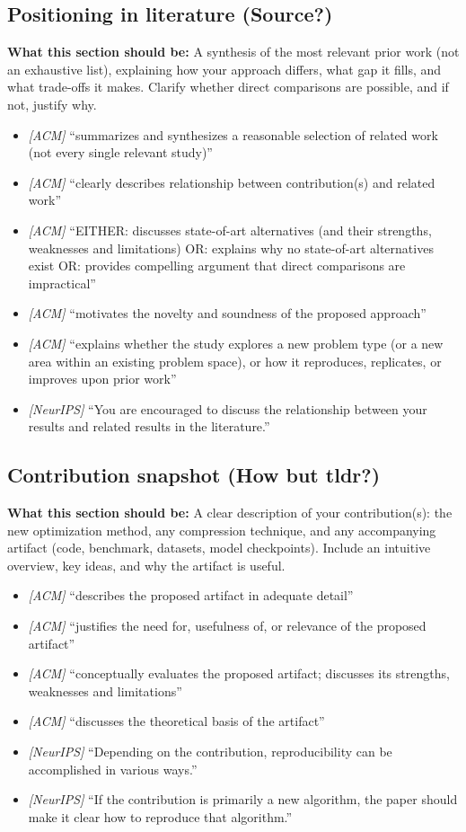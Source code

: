 \documentclass[11pt]{article}
\begin{document}
\subsection{Positioning in literature (Source?)}
\noindent\textbf{What this section should be:}
A synthesis of the most relevant prior work (not an exhaustive list), explaining how your approach differs, what gap it fills, and what trade-offs it makes. Clarify whether direct comparisons are possible, and if not, justify why.
\begin{itemize}
  \item \textit{[ACM]} ``summarizes and synthesizes a reasonable selection of related work (not every single relevant study)''
  \item \textit{[ACM]} ``clearly describes relationship between contribution(s) and related work''
  \item \textit{[ACM]} ``EITHER: discusses state-of-art alternatives (and their strengths, weaknesses and limitations) OR: explains why no state-of-art alternatives exist OR: provides compelling argument that direct comparisons are impractical''
  \item \textit{[ACM]} ``motivates the novelty and soundness of the proposed approach''
  \item \textit{[ACM]} ``explains whether the study explores a new problem type (or a new area within an existing problem space), or how it reproduces, replicates, or improves upon prior work''
  \item \textit{[NeurIPS]} ``You are encouraged to discuss the relationship between your results and related results in the literature.''
\end{itemize}

\subsection{Contribution snapshot (How but tldr?)}
\noindent\textbf{What this section should be:}
A clear description of your contribution(s): the new optimization method, any compression technique, and any accompanying artifact (code, benchmark, datasets, model checkpoints). Include an intuitive overview, key ideas, and why the artifact is useful.
\begin{itemize}
  \item \textit{[ACM]} ``describes the proposed artifact in adequate detail''
  \item \textit{[ACM]} ``justifies the need for, usefulness of, or relevance of the proposed artifact''
  \item \textit{[ACM]} ``conceptually evaluates the proposed artifact; discusses its strengths, weaknesses and limitations''
  \item \textit{[ACM]} ``discusses the theoretical basis of the artifact''
  \item \textit{[NeurIPS]} ``Depending on the contribution, reproducibility can be accomplished in various ways.''
  \item \textit{[NeurIPS]} ``If the contribution is primarily a new algorithm, the paper should make it clear how to reproduce that algorithm.''
\end{itemize}
\end{document}

